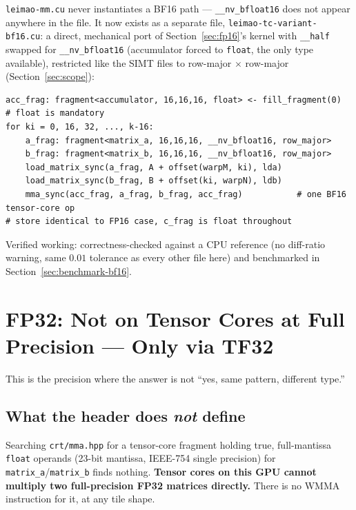 \documentclass[11pt]{article}
\begin{document}
\texttt{leimao-mm.cu} never instantiates a BF16 path --- \texttt{\_\_nv\_bfloat16} does
not appear anywhere in the file. It now exists as a separate file,
\texttt{leimao-tc-variant-bf16.cu}: a direct, mechanical port of
Section~\ref{sec:fp16}'s kernel with \texttt{\_\_half} swapped for
\texttt{\_\_nv\_bfloat16} (accumulator forced to \texttt{float}, the only type
available), restricted like the SIMT files to row-major $\times$ row-major
(Section~\ref{sec:scope}):
\begin{lstlisting}
acc_frag: fragment<accumulator, 16,16,16, float> <- fill_fragment(0)   # float is mandatory
for ki = 0, 16, 32, ..., k-16:
    a_frag: fragment<matrix_a, 16,16,16, __nv_bfloat16, row_major>
    b_frag: fragment<matrix_b, 16,16,16, __nv_bfloat16, row_major>
    load_matrix_sync(a_frag, A + offset(warpM, ki), lda)
    load_matrix_sync(b_frag, B + offset(ki, warpN), ldb)
    mma_sync(acc_frag, a_frag, b_frag, acc_frag)           # one BF16 tensor-core op
# store identical to FP16 case, c_frag is float throughout
\end{lstlisting}
Verified working: correctness-checked against a CPU reference (no diff-ratio warning,
same $0.01$ tolerance as every other file here) and benchmarked in
Section~\ref{sec:benchmark-bf16}.

\section{FP32: Not on Tensor Cores at Full Precision --- Only via TF32}
\label{sec:fp32}

This is the precision where the answer is not ``yes, same pattern, different type.''

\subsection{What the header does \emph{not} define}
Searching \texttt{crt/mma.hpp} for a tensor-core fragment holding true, full-mantissa
\texttt{float} operands (23-bit mantissa, IEEE-754 single precision) for
\texttt{matrix\_a}/\texttt{matrix\_b} finds nothing. \textbf{Tensor cores on this GPU
cannot multiply two full-precision FP32 matrices directly.} There is no WMMA
instruction for it, at any tile shape.
\end{document}
